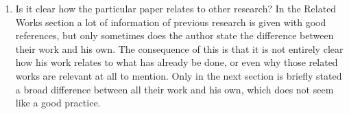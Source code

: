 \documentclass{article}
\begin{document}
\begin{enumerate}
{\begin{enumerate}
    \item{Is it clear how the particular paper relates to other research?}
    In the Related Works section a lot of information of previous research is given with good references, but only sometimes does the author state the difference between their work and his own. The consequence of this is that it is not entirely clear how his work relates to what has already be done, or even why those related works are relevant at all to mention. Only in the next section is briefly stated a broad difference between all their work and his own, which does not seem like a good practice.
    \end{enumerate}
    }
    
\end{enumerate}
\end{document}
